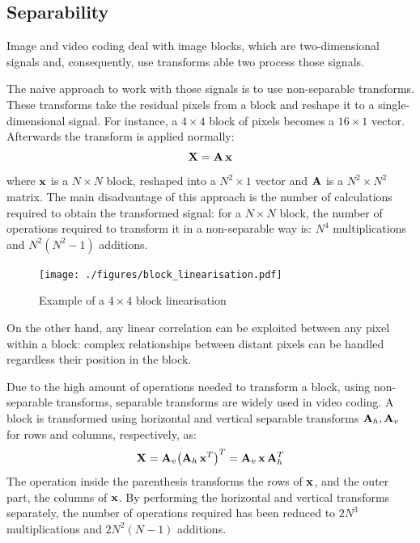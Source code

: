 \documentclass[11pt,a4paper,openright,twoside]{book}
\numberwithin{equation}{section} %
\numberwithin{figure}{section} %
\numberwithin{table}{section} %
\begin{document}
\subsection{Separability}
\label{sub:separability}

Image and video coding deal with image blocks, which are two-dimensional
signals and, consequently, use transforms able two process those
signals.

The naive approach to work with those signals is to use non-separable
transforms.
These transforms take the residual pixels from a block and reshape it to a
single-dimensional signal. For instance, a $4\times4$ block of pixels becomes a
$16\times1$ vector.
Afterwards the transform is applied normally:
\begin{equation}
	\mathbf{X} = \mathbf{A} \, \mathbf{x}
\end{equation}
where $\mathbf{x}$ is a $N \times N$ block, reshaped into a $N^2\times1$ vector
and $\mathbf{A}$ is a $N^2 \times N^2$ matrix.
The main disadvantage of this approach is the number of calculations
required to obtain the transformed signal: for a $N \times N$ block, the
number of operations required to transform it in a non-separable way is:
$N^4$ multiplications and $N^2(N^2-1)$ additions.

\begin{figure}[tb]
	\centering
	\texttt{[image: ./figures/block\_linearisation.pdf]}
	\caption{Example of a $4\times4$ block linearisation}
	\label{fig:block_linearisation}
\end{figure}

On the other hand, any linear correlation can be exploited between any pixel
within a block:
complex relationships between distant pixels can be handled regardless their
position in the block.

Due to the high amount of operations needed to transform a block, using
non-separable transforms, separable transforms are widely used in video
coding.
A block is transformed using horizontal and vertical separable transforms
$\mathbf{A}_h, \mathbf{A}_v$ for rows and columns, respectively, as:
\begin{equation}
	\mathbf{X} = \mathbf{A}_v {\left(\mathbf{A}_h \, \mathbf{x}^T\right)}^T = \mathbf{A}_v \, \mathbf{x} \, \mathbf{A}_h^T
	\label{eqn:sep_transform}
\end{equation}
The operation inside the parenthesis transforms the rows of $\mathbf{x}$, and
the outer part, the columns of $\mathbf{x}$.
By performing the horizontal and vertical transforms separately, the
number of operations required has been reduced to $2N^3$ multiplications
and $2N^2(N-1)$ additions.
\end{document}
